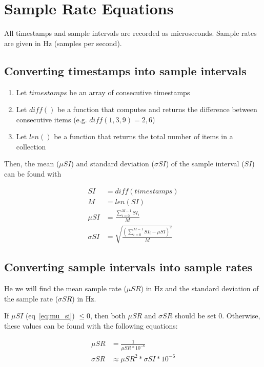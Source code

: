 \documentclass[11pt]{article}
\begin{document}
    \section{Sample Rate Equations}\label{sec:sample-rate-equations}
    All timestamps and sample intervals are recorded as microseconds.
    Sample rates are given in Hz (samples per second).

    \subsection{Converting timestamps into sample intervals}\label{subsec:converting-timestamps-into-sample-intervals}

    \begin{enumerate}
        \item Let $timestamps$ be an array of consecutive timestamps
        \item Let $diff()$ be a function that computes and returns the difference between consecutive items (e.g. $diff(1,3,9)=2,6$)
        \item Let $len()$ be a function that returns the total number of items in a collection
    \end{enumerate}

    Then, the mean ($\mu SI$) and standard deviation ($\sigma SI$) of the sample interval ($SI$) can be found with

    \begin{align}
        SI &= diff(timestamps) \\
        M &= len(SI) \\
        \mu SI &= \frac{\sum_{i=0}^{M-1} SI_i}{M} \\ \label{eq:mu_si}
        \sigma SI &= \sqrt{\frac{(\sum_{i=0}^{M-1} SI_i - \mu SI)^2}{M}}
    \end{align}

    \subsection{Converting sample intervals into sample rates}\label{subsec:converting-sample-intervals-into-sample-rates}

    He we will find the mean sample rate ($\mu SR$) in Hz and the standard deviation of the sample rate ($\sigma SR$) in Hz.

    If $\mu SI$ (eq~\ref{eq:mu_si}) $\leq 0$, then both $\mu SR$ and $\sigma SR$ should be set 0. Otherwise, these values can be found with the following equations:

    \begin{align}
        \mu SR &= \frac{1}{\mu SR * 10^{-6}} \\
        \sigma SR &\approx \mu SR^2 * \sigma SI * 10^{-6}
    \end{align}
\end{document}
